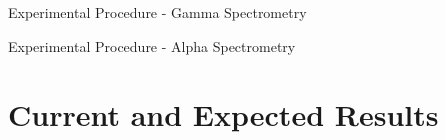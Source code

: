 \documentclass{beamer}
\begin{document}
\begin{frame}{Experimental Procedure - Gamma Spectrometry}

\end{frame}

\begin{frame}{Experimental Procedure - Alpha Spectrometry}

\end{frame}



\section{Current and Expected Results}
\begin{frame}
  \sectionpage
\end{frame}
\end{document}

